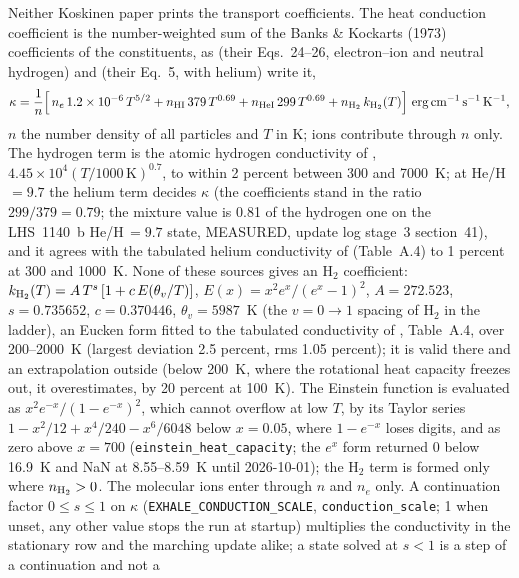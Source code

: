 Neither Koskinen paper prints the transport coefficients.  The heat
conduction coefficient is the number-weighted sum of the Banks \& Kockarts
(1973) coefficients of the constituents, as \citet{Salz2015} (their
Eqs.~24--26, electron--ion and neutral hydrogen) and \citet{Sutton2015}
(their Eq.~5, with helium) write it,
%
\begin{equation}
  \kappa = \frac{1}{n}\Bigl[\,n_e\,1.2\times10^{-6}\,T^{5/2}
     + n_{\rm HI}\,379\,T^{0.69} + n_{\rm HeI}\,299\,T^{0.69}
     + n_{\rm H_2}\,k_{\rm H_2}(T)\Bigr]
  \ \mathrm{erg\,cm^{-1}\,s^{-1}\,K^{-1}},
  \label{eq:transport_coeff}
\end{equation}
%
$n$ the number density of all particles and $T$ in K; ions contribute through
$n$ only.  The hydrogen term is the atomic hydrogen conductivity of
\citet{Watson1981}, $4.45\times10^{4}(T/1000\,\mathrm{K})^{0.7}$, to within
2 percent between 300 and 7000~K; at He/H $=9.7$ the helium term decides
$\kappa$ (the coefficients stand in the ratio $299/379 = 0.79$; the mixture
value is 0.81 of the hydrogen one on the LHS~1140~b He/H\,$=9.7$ state,
MEASURED, update log stage~3 section~41), and it
agrees with the tabulated helium conductivity of \citet{Incropera2007}
(Table~A.4) to 1 percent at 300 and 1000~K.  None of these sources gives an
H$_2$ coefficient: $k_{\rm H_2}(T) = A\,T^{s}\,[1 + c\,E(\theta_v/T)]$,
$E(x) = x^2 e^x/(e^x-1)^2$, $A = 272.523$, $s = 0.735652$, $c = 0.370446$,
$\theta_v = 5987$~K (the $v=0\to1$ spacing of H$_2$ in the
\citet{Roueff2019} ladder), an Eucken form fitted to the tabulated
conductivity of \citet{Incropera2007}, Table~A.4, over 200--2000~K (largest
deviation 2.5 percent, rms 1.05 percent); it is valid there and an
extrapolation outside (below 200~K, where the rotational heat capacity
freezes out, it overestimates, by 20 percent at 100~K).  The Einstein function is evaluated as
$x^2e^{-x}/(1-e^{-x})^2$, which cannot overflow at low $T$, by its Taylor
series $1-x^2/12+x^4/240-x^6/6048$ below $x = 0.05$, where $1-e^{-x}$ loses
digits, and as zero above $x = 700$ (\texttt{einstein\_heat\_capacity}; the
$e^{x}$ form returned 0 below 16.9~K and NaN at 8.55--8.59~K until
2026-10-01); the H$_2$ term is formed only where $n_{\rm H_2}>0$.  The
molecular ions enter through $n$ and $n_e$ only.  A continuation factor
$0\le s\le1$ on $\kappa$ (\texttt{EXHALE\_CONDUCTION\_SCALE},
\texttt{conduction\_scale}; 1 when unset, any other value stops the run at
startup) multiplies the conductivity in the stationary row and the marching
update alike; a state solved at $s<1$ is a step of a continuation and not a
